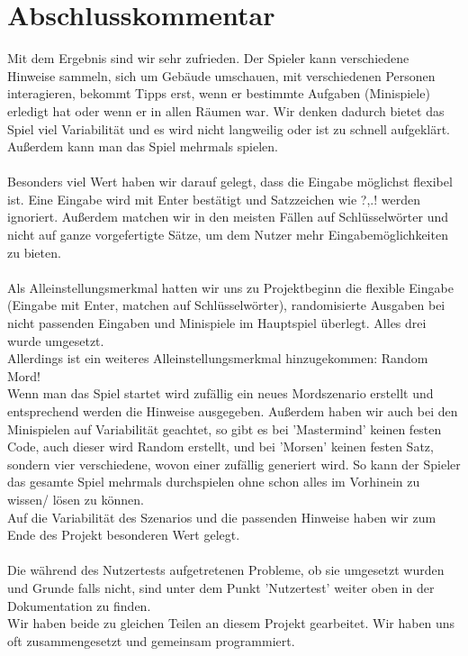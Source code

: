\documentclass[10pt,a4paper]{article}
\begin{document}
\newpage
\section*{Abschlusskommentar}
Mit dem Ergebnis sind wir sehr zufrieden. Der Spieler kann verschiedene Hinweise sammeln, sich um Gebäude umschauen, mit verschiedenen Personen interagieren, bekommt Tipps erst, wenn er bestimmte Aufgaben (Minispiele) erledigt hat oder wenn er in allen Räumen war. Wir denken dadurch bietet das Spiel viel Variabilität und es wird nicht langweilig oder ist zu schnell aufgeklärt. Außerdem kann man das Spiel mehrmals spielen.\\
\\
Besonders viel Wert haben wir darauf gelegt, dass die Eingabe möglichst flexibel ist. Eine Eingabe wird mit Enter bestätigt und Satzzeichen wie ?,.! werden ignoriert. Außerdem matchen wir in den meisten Fällen auf Schlüsselwörter und nicht auf ganze vorgefertigte Sätze, um dem Nutzer mehr Eingabemöglichkeiten zu bieten. \\
\\
Als Alleinstellungsmerkmal hatten wir uns zu Projektbeginn die flexible Eingabe (Eingabe mit Enter, matchen auf Schlüsselwörter), randomisierte Ausgaben bei nicht passenden Eingaben und Minispiele im Hauptspiel überlegt. Alles drei wurde umgesetzt. \\
Allerdings ist ein weiteres Alleinstellungsmerkmal hinzugekommen: Random Mord!\\
Wenn man das Spiel startet wird zufällig ein neues Mordszenario erstellt und entsprechend werden die Hinweise ausgegeben. Außerdem haben wir auch bei den Minispielen auf Variabilität geachtet, so gibt es bei 'Mastermind' keinen festen Code, auch dieser wird Random erstellt, und bei 'Morsen' keinen festen Satz, sondern vier verschiedene, wovon einer zufällig generiert wird. So kann der Spieler das gesamte Spiel mehrmals durchspielen ohne schon alles im Vorhinein zu wissen/ lösen zu können.\\
Auf die Variabilität des Szenarios und die passenden Hinweise haben wir zum Ende des Projekt besonderen Wert gelegt.\\
\\
Die während des Nutzertests aufgetretenen Probleme, ob sie umgesetzt wurden und Grunde falls nicht, sind unter dem Punkt 'Nutzertest' weiter oben in der Dokumentation zu finden.\\
Wir haben beide zu gleichen Teilen an diesem Projekt gearbeitet. Wir haben uns oft zusammengesetzt und gemeinsam programmiert.\\
\end{document}
